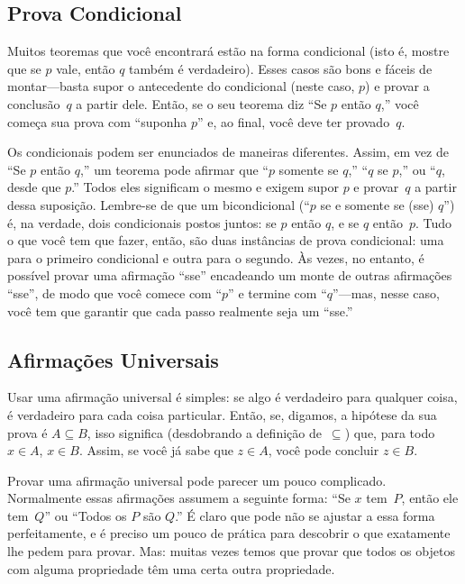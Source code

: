 \documentclass[../../../include/open-logic-section]{subfiles}
\begin{document}
\subsection{Prova Condicional}

Muitos teoremas que você encontrará estão na forma condicional (isto é, mostre
que se $p$ vale, então $q$ também é verdadeiro). Esses casos são bons e
fáceis de montar---basta supor o antecedente do condicional (neste
caso, $p$) e provar a conclusão~$q$ a partir dele.  Então, se o seu
teorema diz ``Se $p$ então $q$,'' você começa sua prova com ``suponha
$p$'' e, ao final, você deve ter provado~$q$.

Os condicionais podem ser enunciados de maneiras diferentes. Assim, em vez de ``Se $p$
então $q$,'' um teorema pode afirmar que ``$p$ somente se $q$,'' ``$q$ se
$p$,'' ou ``$q$, desde que $p$.'' Todos eles significam o mesmo e exigem
supor $p$ e provar~$q$ a partir dessa suposição.  Lembre-se de que um
bicondicional (``$p$ se e somente se (sse) $q$'') é, na verdade, dois
condicionais postos juntos: se $p$ então $q$, e se $q$ então~$p$. Tudo
o que você tem que fazer, então, são duas instâncias de prova condicional: uma para
o primeiro condicional e outra para o segundo. Às vezes,
no entanto, é possível provar uma afirmação ``sse'' encadeando
um monte de outras afirmações ``sse'', de modo que você comece com
``$p$'' e termine com ``$q$''---mas, nesse caso, você tem que garantir
que cada passo realmente seja um ``sse.''

\subsection{Afirmações Universais}

Usar uma afirmação universal é simples: se algo é verdadeiro para qualquer coisa,
é verdadeiro para cada coisa particular.  Então, se, digamos, a hipótese da
sua prova é $A \subseteq B$, isso significa (desdobrando a definição
de~$\subseteq$) que, para todo $x \in A$, $x \in B$. Assim, se você
já sabe que $z \in A$, você pode concluir $z \in B$.

Provar uma afirmação universal pode parecer um pouco complicado. Normalmente essas
afirmações assumem a seguinte forma: ``Se $x$ tem~$P$, então ele
tem~$Q$'' ou ``Todos os $P$ são $Q$.'' É claro que pode não se ajustar a essa
forma perfeitamente, e é preciso um pouco de prática para descobrir o que
exatamente lhe pedem para provar. Mas: muitas vezes temos que provar que todos os objetos
com alguma propriedade têm uma certa outra propriedade.
\end{document}
